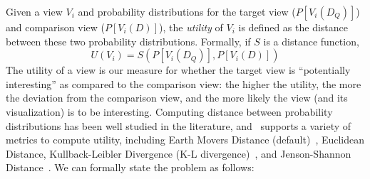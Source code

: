 Given a view $V_i$ and probability distributions for the
target view  ($P[V_i (D_Q)]$) and comparison view ($P[V_i (D)]$), the
{\em utility} of $V_i$ is defined as the distance between these two probability
distributions. Formally, if $S$ is a distance function,
$$ U (V_i) = S ( P[V_i (D_Q)], P[V_i (D)] )$$
The utility of a view is our measure for whether the target view is
``potentially interesting'' as compared to the comparison view:
the higher the utility, the more the deviation
from the comparison view, and the more likely the view (and its visualization) is to be interesting.
Computing distance between probability distributions has
been well studied in the literature, and \SeeDB\ supports a variety of metrics
to compute utility, including Earth Movers Distance (default)~\cite{wikipedia-prob-dist}, 
Euclidean Distance, Kullback-Leibler Divergence (K-L
divergence)~\cite{wikipedia-KL}, and Jenson-Shannon
Distance~\cite{wikipedia-JS,entropy-vis}. 
We can formally state the \SeeDB problem as follows:



